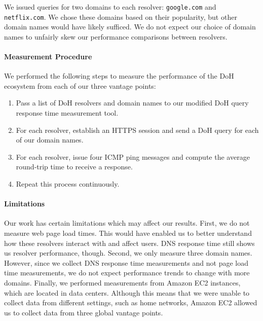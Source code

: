 We issued queries for two domains to each resolver: \texttt{google.com} and \texttt{netflix.com}.
We chose these domains based on their popularity, but other domain names would have likely sufficed.
We do not expect our choice of domain names to unfairly skew our performance comparisons between resolvers.

\paragraph{Measurement Procedure}
We performed the following steps to measure the performance of the DoH ecosystem from each of our three vantage points:
\begin{enumerate}
    \item Pass a list of DoH resolvers and domain names to our modified DoH query response time measurement tool.
    \item For each resolver, establish an HTTPS session and send a DoH query for each of our domain names.
    \item For each resolver, issue four ICMP ping messages and compute the average round-trip time to receive a response.
    \item Repeat this process continuously.
\end{enumerate}

\paragraph{Limitations}
Our work has certain limitations which may affect our results. 
First, we do not measure web page load times. 
This would have enabled us to better understand how these resolvers interact with and affect users. 
DNS response time still shows us resolver performance, though. 
Second, we only measure three domain names. 
However, since we collect DNS response time measurements and not page load time measurements, we do not expect performance trends to change with more domains.
Finally, we performed measurements from Amazon EC2 instances, which are located in data centers. 
Although this means that we were unable to collect data from different settings, such as home networks, Amazon EC2 allowed us to collect data from three global vantage points. 
